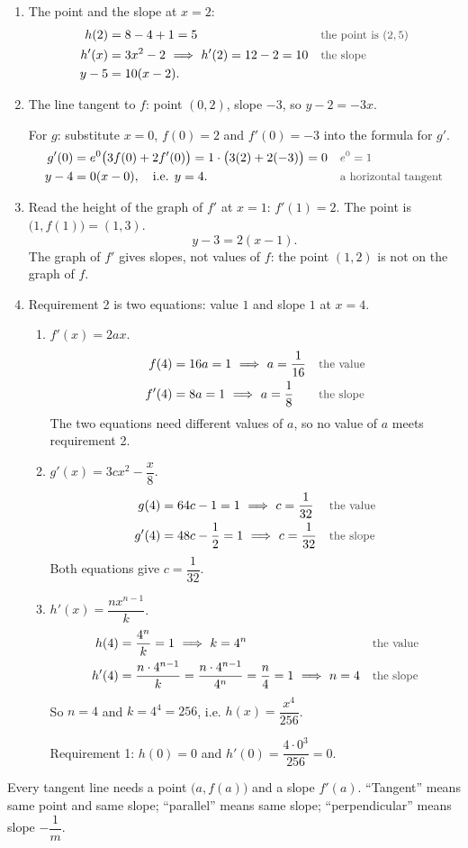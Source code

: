 \documentclass[11pt,a4paper]{article}
\newcounter{example}
\newcommand{\why}[1]{\text{\small\color{darkgray}#1}}
\newcommand{\imp}{\ \Longrightarrow\ }
\begin{document}
\begin{examplesolution}
\relax
\begin{enumerate}[label=(\alph*)]
 \item The point and the slope at $x=2$:
 \begin{align*}
 h(2)&=8-4+1=5 &&\why{the point is $(2,5)$}\\
 h'(x)&=3x^2-2\imp h'(2)=12-2=10 &&\why{the slope}\\
 y-5&=10(x-2).
 \end{align*}
 \item The line tangent to $f$: point $(0,2)$, slope $-3$, so $y-2=-3x$.

 For $g$: substitute $x=0$, $f(0)=2$ and $f'(0)=-3$ into the formula for $g'$.
 \begin{align*}
 g'(0)&=e^0\bigl(3f(0)+2f'(0)\bigr)=1\cdot\bigl(3(2)+2(-3)\bigr)=0 &&\why{$e^0=1$}\\
 y-4&=0(x-0),\quad\text{i.e. } y=4. &&\why{a horizontal tangent}
 \end{align*}
 \item Read the height of the graph of $f'$ at $x=1$: $f'(1)=2$. The point is $\bigl(1,f(1)\bigr)=(1,3)$.
 \[
 y-3=2(x-1).
 \]
 The graph of $f'$ gives slopes, not values of $f$: the point $(1,2)$ is not on the graph of $f$.
 \item Requirement 2 is two equations: value $1$ and slope $1$ at $x=4$.
 \begin{enumerate}[label=(\roman*)]
  \item $f'(x)=2ax$.
  \begin{align*}
  f(4)&=16a=1\imp a=\frac1{16} &&\why{the value}\\
  f'(4)&=8a=1\imp a=\frac18 &&\why{the slope}
  \end{align*}
  The two equations need different values of $a$, so no value of $a$ meets requirement 2.
  \item $g'(x)=3cx^2-\dfrac{x}{8}$.
  \begin{align*}
  g(4)&=64c-1=1\imp c=\frac1{32} &&\why{the value}\\
  g'(4)&=48c-\frac12=1\imp c=\frac1{32} &&\why{the slope}
  \end{align*}
  Both equations give $c=\dfrac1{32}$.
  \item $h'(x)=\dfrac{nx^{n-1}}{k}$.
  \begin{align*}
  h(4)&=\frac{4^n}{k}=1\imp k=4^n &&\why{the value}\\
  h'(4)&=\frac{n\cdot4^{n-1}}{k}=\frac{n\cdot4^{n-1}}{4^n}=\frac n4=1\imp n=4 &&\why{the slope}
  \end{align*}
  So $n=4$ and $k=4^4=256$, i.e. $h(x)=\dfrac{x^4}{256}$.

  Requirement 1: $h(0)=0$ and $h'(0)=\dfrac{4\cdot0^3}{256}=0$.
 \end{enumerate}
\end{enumerate}
\begin{takeaway}
Every tangent line needs a point $\bigl(a,f(a)\bigr)$ and a slope $f'(a)$. ``Tangent'' means same point and same slope; ``parallel'' means same slope; ``perpendicular'' means slope $-\dfrac1m$.
\end{takeaway}
\end{examplesolution}
\end{document}
